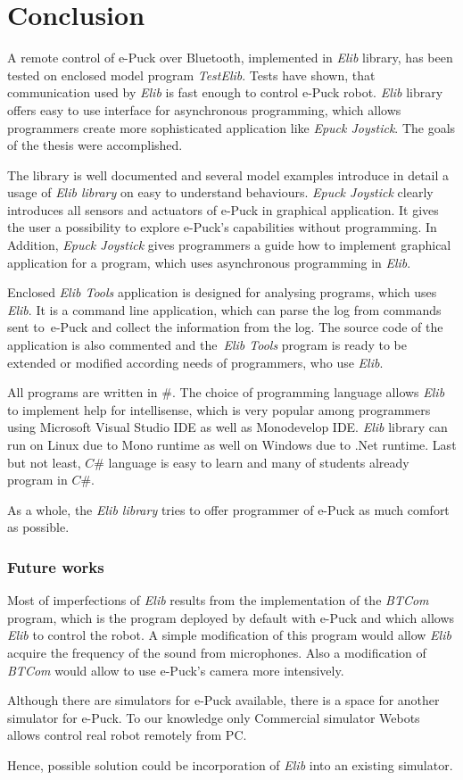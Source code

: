 \chapter{Conclusion} \label{chap:conclusion}
  A remote control of e-Puck over Bluetooth, implemented in {\it Elib} library, 
  has been tested on enclosed model program {\it TestElib}. 
  Tests have shown, that communication used by {\it Elib} is fast enough
  to control e-Puck robot.
  {\it Elib} library offers easy to use interface for asynchronous programming,
  which allows programmers create more sophisticated application like {\it Epuck Joystick}.
  The goals of the thesis were accomplished.
  
  The library is well documented and several model examples introduce in detail
  a usage of {\it Elib library} on easy to understand behaviours.
  {\it Epuck Joystick} clearly introduces all sensors and actuators of e-Puck in graphical application.
  It gives the user a possibility to explore e-Puck's capabilities without programming.
  In Addition, {\it Epuck Joystick} gives programmers a guide how to implement graphical application for a program, which uses asynchronous programming in {\it Elib}. 

  Enclosed {\it Elib Tools} application is designed for analysing
  programs, which uses {\it Elib}.
  It is a command line application, which can parse the log from commands sent 
  to~e-Puck and collect the information from the log.
  The source code of the application is also commented and 
  the~{\it Elib Tools} program is  ready to be extended 
  or modified according needs of programmers, who use {\it Elib}.
  
  All programs are written in $\#$. The choice of programming language
  allows {\it Elib} to implement help for intellisense,
  which is very popular among programmers using Microsoft Visual Studio IDE
  as well as Monodevelop IDE. {\it Elib} library can run on Linux due to
  Mono runtime as well on Windows due to .Net runtime.
  Last but not least, $C\#$ language is easy to learn 
  and many of students already program in $C\#$.

  As a whole, the {\it Elib library} tries to offer programmer
  of e-Puck as much comfort as possible.

\subsection*{Future works}
  Most of imperfections of {\it Elib} results from the implementation 
  of the {\it BTCom} program, which is the program deployed by default with e-Puck 
  and which allows {\it Elib} to control the robot.
  A simple modification of this program would allow {\it Elib} acquire the frequency 
  of the sound from microphones.
  Also a modification of {\it BTCom} would allow to use e-Puck's camera more intensively.

  Although there are simulators for e-Puck available, 
  there is a space for another simulator for e-Puck. To our knowledge only
  Commercial simulator Webots allows control real robot remotely from PC. 

  Hence, possible solution could be incorporation of {\it Elib} into an existing simulator.

